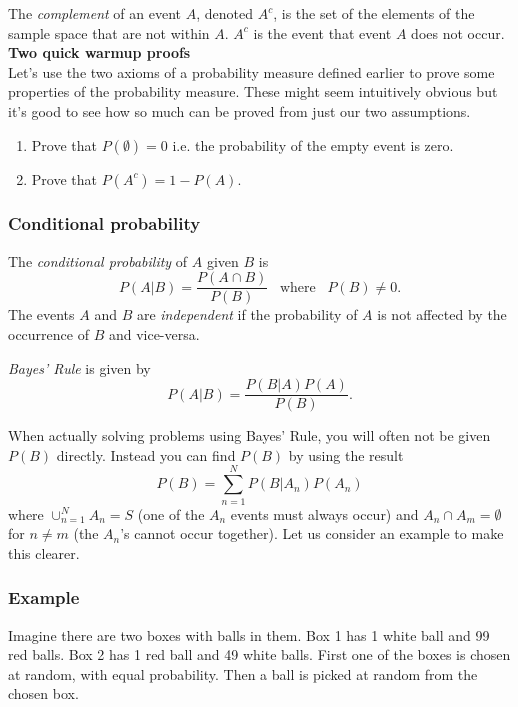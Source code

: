 The { \em complement} of an event $A$, denoted $A^{c}$, is the set of the elements of the sample space that are not within $A$. $A^{c}$ is the event that event $A$ does not occur.\\

{\bf Two quick warmup proofs}\\
Let's use the two axioms of a probability measure defined earlier to prove some properties of the probability measure. These might seem intuitively obvious but it's good to see how so much can be proved from just our two assumptions.
\begin{enumerate}
 \item Prove that $P(\emptyset)=0$ i.e. the probability of the empty event is zero.
 \item Prove that $P(A^{c})=1-P(A)$.
\end{enumerate}

\subsubsection*{Conditional probability}

The {\em conditional probability} of $A$ given $B$ is
\begin{equation*}
 P(A|B)=\frac{P(A\cap B)}{P(B)} \hspace{10pt} \text{where} \hspace{10pt} P(B)\neq 0.
\end{equation*}
The events $A$ and $B$ are {\em independent} if the probability of $A$ is not affected by the occurrence of $B$ and vice-versa.

{\em Bayes' Rule} is given by
\begin{equation*}
 P(A|B)=\frac{P(B|A)P(A)}{P(B)}.
\end{equation*}

When actually solving problems using Bayes' Rule, you will often not be given $P(B)$ directly. Instead you can find $P(B)$ by using the result
\begin{equation}\label{eq:pb}
P(B)= \sum_{n=1}^{N}P(B|A_{n})P(A_{n})
\end{equation}
where $\cup_{n=1}^{N}A_{n}=S$ (one of the $A_n$ events must always occur) and $A_{n} \cap A_{m}=\emptyset$ for $n\neq m$ (the $A_{n}$'s cannot occur together). Let us consider an example to make this clearer.

\subsubsection*{Example}
Imagine there are two boxes with balls in them. Box 1 has 1 white ball and 99 red balls. Box 2 has 1 red ball and 49 white balls. First one of the boxes is chosen at random, with equal probability. Then a ball is picked at random from the chosen box.

